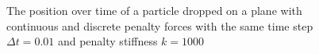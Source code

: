 \begin{figure}[tbp] 
\begin{minipage}[b]{0.5 \linewidth}
		\centering
	\end{minipage}
	\begin{minipage}[b]{0.5 \linewidth}
		\centering
	\end{minipage}

  \caption{The position over time of a particle dropped on a plane with continuous and discrete penalty forces with the same time step $\Delta t=0.01$ and penalty stiffness $k=1000$}
  \label{fig::particle_samedt}
\end{figure}

